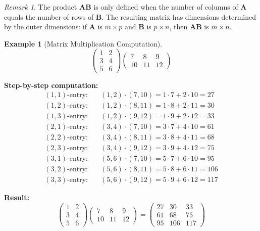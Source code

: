 \documentclass[12pt]{article}
\numberwithin{equation}{section}
\newcommand{\mat}[1]{\mathbf{#1}}        %
\theoremstyle{plain}
\theoremstyle{definition}
\newtheorem{example}[theorem]{Example}
\theoremstyle{remark}
\newtheorem{remark}[theorem]{Remark}
\begin{document}
\begin{remark}
The product $\mat{A}\mat{B}$ is only defined when the number of columns of $\mat{A}$ equals the number of rows of $\mat{B}$. The resulting matrix has dimensions determined by the outer dimensions: if $\mat{A}$ is $m \times p$ and $\mat{B}$ is $p \times n$, then $\mat{A}\mat{B}$ is $m \times n$.
\end{remark}

\begin{example}[Matrix Multiplication Computation]
$$\begin{pmatrix} 1 & 2 \\ 3 & 4 \\ 5 & 6 \end{pmatrix} \begin{pmatrix} 7 & 8 & 9 \\ 10 & 11 & 12 \end{pmatrix}$$

\textbf{Step-by-step computation:}
\begin{align}
(1,1)\text{-entry:} \quad &(1, 2) \cdot (7, 10) = 1 \cdot 7 + 2 \cdot 10 = 27\\
(1,2)\text{-entry:} \quad &(1, 2) \cdot (8, 11) = 1 \cdot 8 + 2 \cdot 11 = 30\\
(1,3)\text{-entry:} \quad &(1, 2) \cdot (9, 12) = 1 \cdot 9 + 2 \cdot 12 = 33\\
(2,1)\text{-entry:} \quad &(3, 4) \cdot (7, 10) = 3 \cdot 7 + 4 \cdot 10 = 61\\
(2,2)\text{-entry:} \quad &(3, 4) \cdot (8, 11) = 3 \cdot 8 + 4 \cdot 11 = 68\\
(2,3)\text{-entry:} \quad &(3, 4) \cdot (9, 12) = 3 \cdot 9 + 4 \cdot 12 = 75\\
(3,1)\text{-entry:} \quad &(5, 6) \cdot (7, 10) = 5 \cdot 7 + 6 \cdot 10 = 95\\
(3,2)\text{-entry:} \quad &(5, 6) \cdot (8, 11) = 5 \cdot 8 + 6 \cdot 11 = 106\\
(3,3)\text{-entry:} \quad &(5, 6) \cdot (9, 12) = 5 \cdot 9 + 6 \cdot 12 = 117
\end{align}

\textbf{Result:}
$$\begin{pmatrix} 1 & 2 \\ 3 & 4 \\ 5 & 6 \end{pmatrix} \begin{pmatrix} 7 & 8 & 9 \\ 10 & 11 & 12 \end{pmatrix} = \begin{pmatrix} 27 & 30 & 33 \\ 61 & 68 & 75 \\ 95 & 106 & 117 \end{pmatrix}$$
\end{example}
\end{document}
